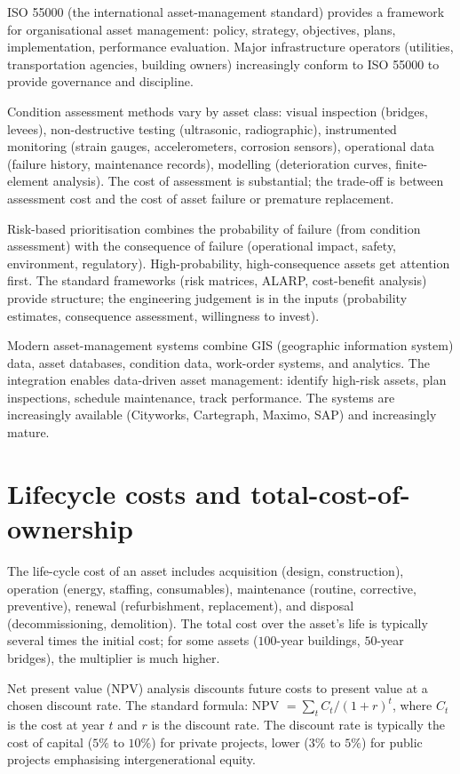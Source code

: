 ISO 55000 (the international asset-management standard) provides a framework for organisational asset management: policy, strategy, objectives, plans, implementation, performance evaluation. Major infrastructure operators (utilities, transportation agencies, building owners) increasingly conform to ISO 55000 to provide governance and discipline.

Condition assessment methods vary by asset class: visual inspection (bridges, levees), non-destructive testing (ultrasonic, radiographic), instrumented monitoring (strain gauges, accelerometers, corrosion sensors), operational data (failure history, maintenance records), modelling (deterioration curves, finite-element analysis). The cost of assessment is substantial; the trade-off is between assessment cost and the cost of asset failure or premature replacement.

Risk-based prioritisation combines the probability of failure (from condition assessment) with the consequence of failure (operational impact, safety, environment, regulatory). High-probability, high-consequence assets get attention first. The standard frameworks (risk matrices, ALARP, cost-benefit analysis) provide structure; the engineering judgement is in the inputs (probability estimates, consequence assessment, willingness to invest).

Modern asset-management systems combine GIS (geographic information system) data, asset databases, condition data, work-order systems, and analytics. The integration enables data-driven asset management: identify high-risk assets, plan inspections, schedule maintenance, track performance. The systems are increasingly available (Cityworks, Cartegraph, Maximo, SAP) and increasingly mature.

\section{Lifecycle costs and total-cost-of-ownership}

The life-cycle cost of an asset includes acquisition (design, construction), operation (energy, staffing, consumables), maintenance (routine, corrective, preventive), renewal (refurbishment, replacement), and disposal (decommissioning, demolition). The total cost over the asset's life is typically several times the initial cost; for some assets ($100$-year buildings, $50$-year bridges), the multiplier is much higher.

Net present value (NPV) analysis discounts future costs to present value at a chosen discount rate. The standard formula: NPV $= \sum_t C_t / (1 + r)^t$, where $C_t$ is the cost at year $t$ and $r$ is the discount rate. The discount rate is typically the cost of capital ($5\%$ to $10\%$) for private projects, lower ($3\%$ to $5\%$) for public projects emphasising intergenerational equity.

